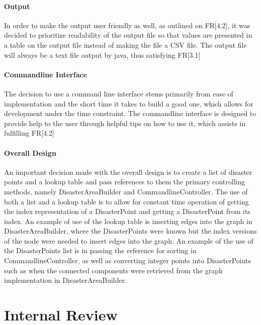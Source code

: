 \documentclass[12pt]{article}
\begin{document}
    \paragraph{Output} In order to make the output user friendly as well, as outlined on FR[4.2], it was decided to prioritize readability of the output file so that values are presented in a table on the output file instead of making the file a CSV file. The output file will always be a text file output by java, thus satisfying FR[3.1]
    
    \paragraph{Commandline Interface} The decision to use a command line interface stems primarily from ease of implementation and the short time it takes to build a good one, which allows for development under the time constraint. The commandline interface is designed to provide help to the user through helpful tips on how to use it, which assists in fulfilling FR[4.2]
    
    \paragraph{Overall Design} An important decision made with the overall design is to create a list of disaster points and a lookup table and pass references to them the primary controlling methods, namely DisasterAreaBuilder and CommandlineController. The use of both a list and a lookup table is to allow for constant time operation of getting the index representation of a DisasterPoint and getting a DisasterPoint from its index. An example of use of the lookup table is inserting edges into the graph in DisasterAreaBuilder, where the DisasterPoints were known but the index versions of the node were needed to insert edges into the graph. An example of the use of the DisasterPoints list is in passing the reference for sorting in CommandlineController, as well as converting integer points into DisasterPoints such as when the connected components were retrieved from the graph implementation in DisasterAreaBuilder.
\newpage
\section{Internal Review}
\end{document}

